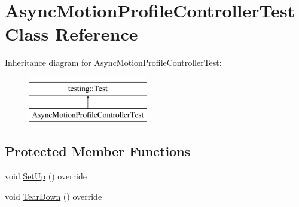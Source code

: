 \hypertarget{classAsyncMotionProfileControllerTest}{}\section{Async\+Motion\+Profile\+Controller\+Test Class Reference}
\label{classAsyncMotionProfileControllerTest}
Inheritance diagram for Async\+Motion\+Profile\+Controller\+Test\+:\begin{figure}[H]
\begin{center}
\leavevmode
\includegraphics[height=2.000000cm]{classAsyncMotionProfileControllerTest}
\end{center}
\end{figure}
\subsection*{Protected Member Functions}
\begin{DoxyCompactItemize}
\item 
void \mbox{\hyperlink{classAsyncMotionProfileControllerTest_a0875f817554a6328621a95b889ec17d6}{Set\+Up}} () override
\item 
void \mbox{\hyperlink{classAsyncMotionProfileControllerTest_a79a40f5b8b209ebf2f66075e2c2ca5af}{Tear\+Down}} () override
\end{DoxyCompactItemize}
